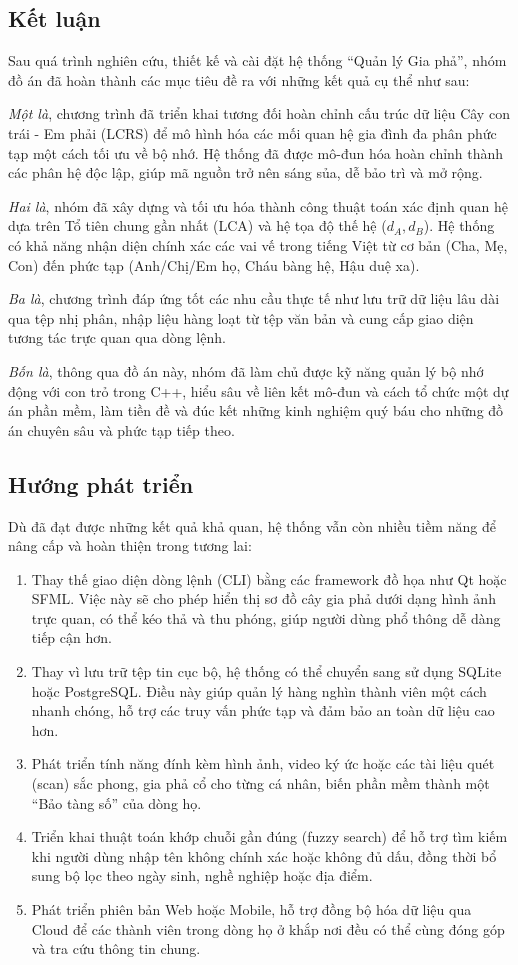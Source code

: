 \subsection{Kết luận}
Sau quá trình nghiên cứu, thiết kế và cài đặt hệ thống ``Quản lý Gia phả'', nhóm đồ án đã hoàn thành các mục tiêu đề ra với những kết quả cụ thể như sau:

\textit{Một là}, chương trình đã triển khai tương đối hoàn chỉnh cấu trúc dữ liệu Cây con trái - Em phải (LCRS) để mô hình hóa các mối quan hệ gia đình đa phân phức tạp một cách tối ưu về bộ nhớ. Hệ thống đã được mô-đun hóa hoàn chỉnh thành các phân hệ độc lập, giúp mã nguồn trở nên sáng sủa, dễ bảo trì và mở rộng.

\textit{Hai là}, nhóm đã xây dựng và tối ưu hóa thành công thuật toán xác định quan hệ dựa trên Tổ tiên chung gần nhất (LCA) và hệ tọa độ thế hệ ($d_A, d_B$). Hệ thống có khả năng nhận diện chính xác các vai vế trong tiếng Việt từ cơ bản (Cha, Mẹ, Con) đến phức tạp (Anh/Chị/Em họ, Cháu bàng hệ, Hậu duệ xa).

\textit{Ba là}, chương trình đáp ứng tốt các nhu cầu thực tế như lưu trữ dữ liệu lâu dài qua tệp nhị phân, nhập liệu hàng loạt từ tệp văn bản và cung cấp giao diện tương tác trực quan qua dòng lệnh.

\textit{Bốn là}, thông qua đồ án này, nhóm đã làm chủ được kỹ năng quản lý bộ nhớ động với con trỏ trong C++, hiểu sâu về liên kết mô-đun và cách tổ chức một dự án phần mềm, làm tiền đề và đúc kết những kinh nghiệm quý báu cho những đồ án chuyên sâu và phức tạp tiếp theo.

\subsection{Hướng phát triển}

Dù đã đạt được những kết quả khả quan, hệ thống vẫn còn nhiều tiềm năng để nâng cấp và hoàn thiện trong tương lai:
\begin{enumerate}
	\item Thay thế giao diện dòng lệnh (CLI) bằng các framework đồ họa như Qt hoặc SFML. Việc này sẽ cho phép hiển thị sơ đồ cây gia phả dưới dạng hình ảnh trực quan, có thể kéo thả và thu phóng, giúp người dùng phổ thông dễ dàng tiếp cận hơn.
	\item Thay vì lưu trữ tệp tin cục bộ, hệ thống có thể chuyển sang sử dụng SQLite hoặc PostgreSQL. Điều này giúp quản lý hàng nghìn thành viên một cách nhanh chóng, hỗ trợ các truy vấn phức tạp và đảm bảo an toàn dữ liệu cao hơn.
	\item Phát triển tính năng đính kèm hình ảnh, video ký ức hoặc các tài liệu quét (scan) sắc phong, gia phả cổ cho từng cá nhân, biến phần mềm thành một ``Bảo tàng số'' của dòng họ.
	\item Triển khai thuật toán khớp chuỗi gần đúng (fuzzy search) để hỗ trợ tìm kiếm khi người dùng nhập tên không chính xác hoặc không đủ dấu, đồng thời bổ sung bộ lọc theo ngày sinh, nghề nghiệp hoặc địa điểm.
	\item Phát triển phiên bản Web hoặc Mobile, hỗ trợ đồng bộ hóa dữ liệu qua Cloud để các thành viên trong dòng họ ở khắp nơi đều có thể cùng đóng góp và tra cứu thông tin chung.
\end{enumerate}